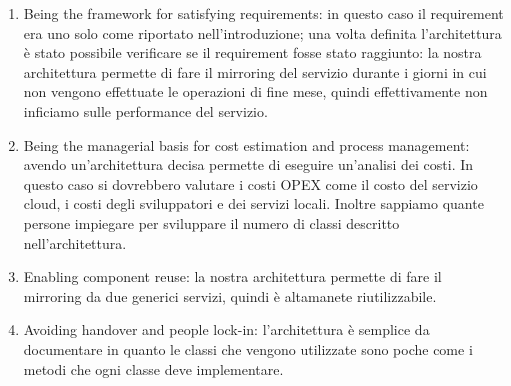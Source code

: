 \documentclass[a4paper]{article}
\begin{document}
\begin{enumerate}
    \item Being the framework for satisfying requirements: in questo caso il requirement era uno solo
    come riportato nell'introduzione; una volta definita l'architettura è stato possibile verificare se
    il requirement fosse stato raggiunto: la nostra architettura permette di fare il mirroring del servizio durante
    i giorni in cui non vengono effettuate le operazioni di fine mese, quindi effettivamente non
    inficiamo sulle performance del servizio.
    \item Being the managerial basis for cost estimation and process management: avendo un'architettura
    decisa permette di eseguire un'analisi dei costi. In questo caso si dovrebbero valutare i costi
    OPEX come il costo del servizio cloud, i costi degli sviluppatori e dei servizi locali. Inoltre
    sappiamo quante persone impiegare per sviluppare il numero di classi descritto nell'architettura. 
    \item Enabling component reuse: la nostra architettura permette di fare il mirroring da due generici servizi,
    quindi è altamanete riutilizzabile.
    \item Avoiding handover and people lock-in: l'architettura è semplice da documentare in quanto le classi che vengono utilizzate sono poche
    come i metodi che ogni classe deve implementare.
\end{enumerate}
\end{document}

